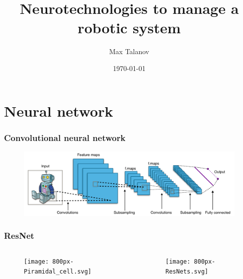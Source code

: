 \documentclass[12pt, aspectratio=169]{beamer}
\title[Neurotechnologies to manage a robotic system]{Neurotechnologies to manage a robotic system} %
\author[Max Talanov]{
  Max Talanov
}
\institute[NcN laboratory: ITIS : KFU]%
{
Neuromorphic computing and Neurosimulations laboratory, ITIS, KFU \\ %
\medskip
\textit{max.talanov@gmail.com} %
}
\date{\today} %
\begin{document}
\begin{frame}
\titlepage %
\end{frame}



\section{Neural network}

\begin{frame}
  \frametitle{Convolutional neural network}
  \begin{figure}
    \includegraphics[width=0.9\linewidth]{Typical_cnn}
  \end{figure}
\end{frame}



\begin{frame}
  \frametitle{ResNet}
  \begin{columns}
    \begin{column}{0.45\textwidth}
      \begin{figure}
        \texttt{[image: 800px-Piramidal\_cell.svg]}
      \end{figure}
    \end{column}
    \begin{column}{0.55\textwidth}
      \texttt{[image: 800px-ResNets.svg]}
    \end{column}
  \end{columns}
\end{frame}


\end{document}
